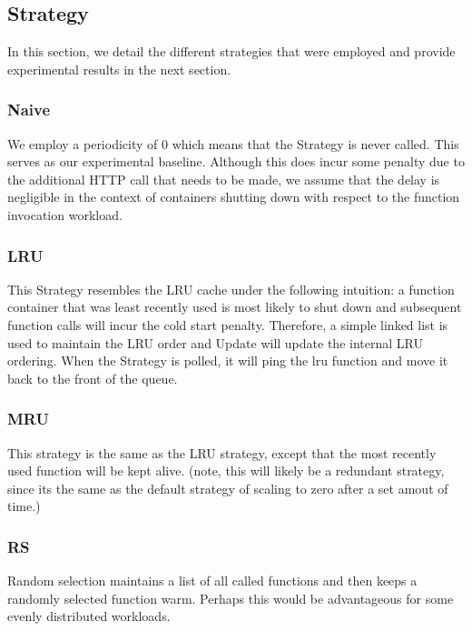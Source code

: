 \documentclass{article}
\begin{document}
\subsection{Strategy}\label{Strategy}

In this section, we detail the different strategies that were employed and provide experimental results in the next section.

\subsubsection{Naive}

We employ a periodicity of 0 which means that the Strategy is never called. This serves as our experimental baseline. Although this does incur some penalty due to the additional HTTP call that needs to be made, we assume that the delay is negligible in the context of containers shutting down with respect to the function invocation workload.

\subsubsection{LRU}

This Strategy resembles the LRU cache under the following intuition: a function container that was least recently used is most likely to shut down and subsequent function calls will incur the cold start penalty. Therefore, a simple linked list is used to maintain the LRU order and Update will update the internal LRU ordering. When the Strategy is polled, it will ping the lru function and move it back to the front of the queue.

\subsubsection{MRU}

This strategy is the same as the LRU strategy, except that the most recently used function will be kept alive. (note, this will likely be a redundant strategy, since its the same as the default strategy of scaling to zero after a set amout of time.)

\subsubsection{RS}

Random selection maintains a list of all called functions and then keeps a randomly selected function warm. Perhaps this would be advantageous for some evenly distributed workloads.
\end{document}
